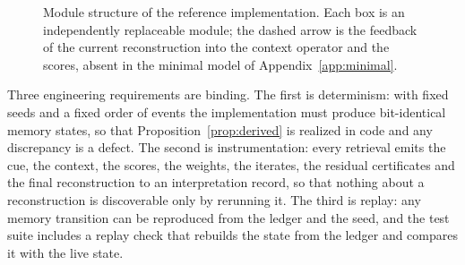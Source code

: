 \begin{figure}[t]
\centering
{}
\caption{Module structure of the reference implementation. Each box is an independently replaceable module; the dashed arrow is the feedback of the current reconstruction into the context operator and the scores, absent in the minimal model of Appendix~\ref{app:minimal}.}\label{fig:modules}
\end{figure}

Three engineering requirements are binding. The first is determinism: with fixed seeds and a fixed order of events the implementation must produce bit-identical memory states, so that Proposition~\ref{prop:derived} is realized in code and any discrepancy is a defect. The second is instrumentation: every retrieval emits the cue, the context, the scores, the weights, the iterates, the residual certificates and the final reconstruction to an interpretation record, so that nothing about a reconstruction is discoverable only by rerunning it. The third is replay: any memory transition can be reproduced from the ledger and the seed, and the test suite includes a replay check that rebuilds the state from the ledger and compares it with the live state.

